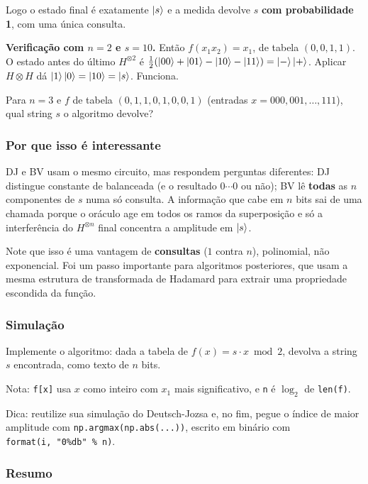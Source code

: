 Logo o estado final é exatamente \(\left|{s}\right>\) e a medida devolve \(s\) \textbf{com probabilidade 1}, com uma única consulta.

\textbf{Verificação com \(n=2\) e \(s=10\).} Então \(f(x_1x_2)=x_1\), de tabela \((0,0,1,1)\). O estado antes do último \(H^{\otimes2}\) é \(\tfrac12(\left|{00}\right>+\left|{01}\right>-\left|{10}\right>-\left|{11}\right>)=\left|{-}\right>\left|{+}\right>\). Aplicar \(H\otimes H\) dá \(\left|{1}\right>\left|{0}\right>=\left|{10}\right>=\left|{s}\right>\). Funciona.

Para \(n=3\) e \(f\) de tabela \((0,1,1,0,1,0,0,1)\) (entradas \(x=000,001,\dots,111\)), qual string \(s\) o algoritmo devolve?

\subsubsection{Por que isso é interessante}\label{por-que-isso-uxe9-interessante}

DJ e BV usam o mesmo circuito, mas respondem perguntas diferentes: DJ distingue constante de balanceada (e o resultado \(0\cdots0\) ou não); BV lê \textbf{todas} as \(n\) componentes de \(s\) numa só consulta. A informação que cabe em \(n\) bits sai de uma chamada porque o oráculo age em todos os ramos da superposição e só a interferência do \(H^{\otimes n}\) final concentra a amplitude em \(\left|{s}\right>\).

Note que isso é uma vantagem de \textbf{consultas} (\(1\) contra \(n\)), polinomial, não exponencial. Foi um passo importante para algoritmos posteriores, que usam a mesma estrutura de transformada de Hadamard para extrair uma propriedade escondida da função.

\subsubsection{Simulação}\label{simulauxe7uxe3o}

Implemente o algoritmo: dada a tabela de \(f(x)=s\cdot x \bmod 2\), devolva a string \(s\) encontrada, como texto de \(n\) bits.

Nota: \texttt{f{[}x{]}} usa \(x\) como inteiro com \(x_1\) mais significativo, e \texttt{n} é \(\log_2\) de \texttt{len(f)}.

Dica: reutilize sua simulação do Deutsch-Jozsa e, no fim, pegue o índice de maior amplitude com \texttt{np.argmax(np.abs(...))}, escrito em binário com \texttt{format(i,\ "0\%db"\ \%\ n)}.

\subsubsection{Resumo}\label{resumo}


